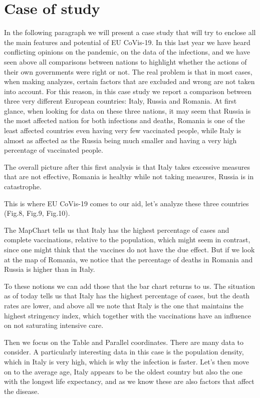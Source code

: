 \documentclass[10pt,conference]{IEEEtran}
\begin{document}
\section{Case of study}
In the following paragraph we will present a case study that will try to enclose all the main features and potential of EU CoVis-19. In this last year we have heard conflicting opinions on the pandemic, on the data of the infections, and we have seen above all comparisons between nations to highlight whether the actions of their own governments were right or not. The real problem is that in most cases, when making analyzes, certain factors that are excluded and wrong are not taken into account. For this reason, in this case study we report a comparison between three very different European countries: Italy, Russia and Romania. At first glance, when looking for data on these three nations, it may seem that Russia is the most affected nation for both infections and deaths, Romania is one of the least affected countries even having very few vaccinated people, while Italy is almost as affected as the Russia being much smaller and having a very high percentage of vaccinated people.

The overall picture after this first analysis is that Italy takes excessive measures that are not effective, Romania is healthy while not taking measures, Russia is in catastrophe.

This is where EU CoVis-19 comes to our aid, let's analyze these three countries (Fig.8, Fig.9, Fig.10).

The MapChart tells us that Italy has the highest percentage of cases and complete vaccinations, relative to the population, which might seem in contrast, since one might think that the vaccines do not have the due effect. But if we look at the map of Romania, we notice that the percentage of deaths in Romania and Russia is higher than in Italy.

To these notions we can add those that the bar chart returns to us. The situation as of today tells us that Italy has the highest percentage of cases, but the death rates are lower, and above all we note that Italy is the one that maintains the highest stringency index, which together with the vaccinations have an influence on not saturating intensive care.

Then we focus on the Table and Parallel coordinates. There are many data to consider. A particularly interesting data in this case is the population density, which in Italy is very high, which is why the infection is faster. Let's then move on to the average age, Italy appears to be the oldest country but also the one with the longest life expectancy, and as we know these are also factors that affect the disease.
\end{document}
